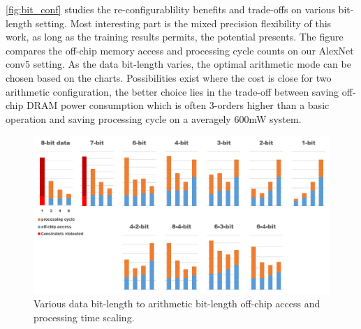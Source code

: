 \begin{table}[h]
    \caption{Performance summary Batch=4}
    \label{tab:perf_sum}
    \centering
    \footnotesize 
\end{table}
\autoref{fig:bit_conf} studies the re-configurablility benefits and trade-offs on various bit-length setting. Most interesting part is the mixed precision flexibility of this work, as long as the training results permits, the potential presents. The figure compares the off-chip memory access and processing cycle counts on our AlexNet conv5 setting. As the data bit-length varies, the optimal arithmetic mode can be chosen based on the charts. Possibilities exist where the cost is close for two arithmetic configuration, the better choice lies in the trade-off between saving off-chip DRAM power consumption which is often 3-orders higher than a basic operation and saving processing cycle on a averagely 600mW system.
\begin{figure}[h]
    \centering
    \includegraphics[width=1\linewidth]{inc/5_results/figure/bit_conf.png}
    \caption{Various data bit-length to arithmetic bit-length off-chip access and processing time scaling.}
    \label{fig:bit_conf}
\end{figure}


